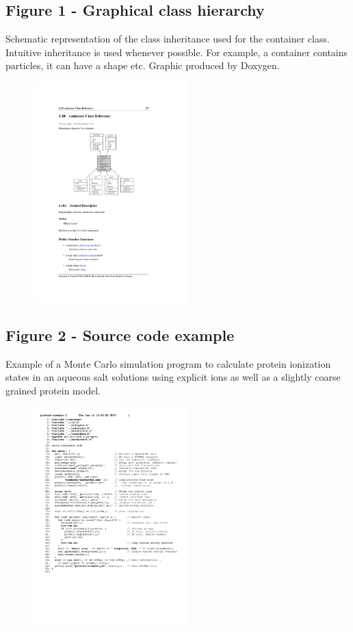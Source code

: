 \documentclass[10pt]{bmc_article}
\newenvironment{bmcformat}{\fussy\setboolean{publ}{true}}{\fussy}
\begin{document}
\begin{bmcformat}
  \subsection*{Figure 1 - Graphical class hierarchy}
      Schematic representation of the class inheritance used for the
      container class. Intuitive inheritance is used whenever possible.
      For example, a container contains particles, it can have a shape
      etc. Graphic produced by Doxygen.
      \begin{figure}[ht]\center
      \includegraphics[width=6cm]{pics/container}
	\end{figure}

  \subsection*{Figure 2 - Source code example}
      Example of a Monte Carlo simulation program to calculate protein
      ionization states in an aqueous salt solutions using explicit ions as well as
      a slightly coarse grained protein model.
      \begin{figure}[ht]\center
      \includegraphics[width=6cm]{pics/source}
      \end{figure}
      

\end{bmcformat}
\end{document}
